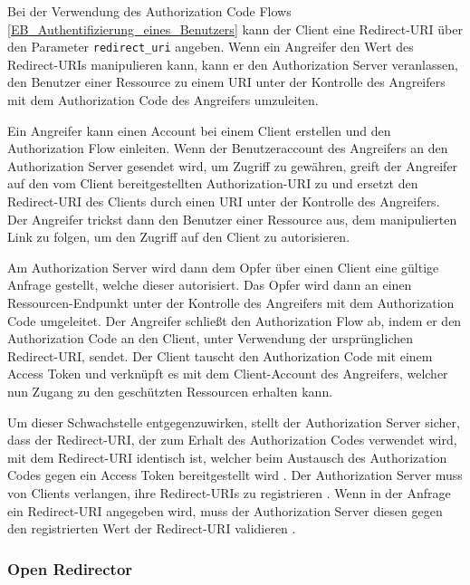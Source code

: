 Bei der Verwendung des Authorization Code Flows \ref{EB_Authentifizierung_eines_Benutzers} kann der Client eine Redirect-URI über den Parameter \texttt{redirect\_uri} angeben. Wenn ein Angreifer den Wert des Redirect-URIs manipulieren kann, kann er den Authorization Server veranlassen, den Benutzer einer Ressource zu einem URI unter der Kontrolle des Angreifers mit dem Authorization Code des Angreifers umzuleiten. \cite{SSEB_OAuthAuthorizationSecurityConsiderations}

Ein Angreifer kann einen Account bei einem Client erstellen und den Authorization Flow einleiten. Wenn der Benutzeraccount des Angreifers an den Authorization Server gesendet wird, um Zugriff zu gewähren, greift der Angreifer auf den vom Client bereitgestellten Authorization-URI zu und ersetzt den Redirect-URI des Clients durch einen URI unter der Kontrolle des Angreifers. Der Angreifer trickst dann den Benutzer einer Ressource aus, dem manipulierten Link zu folgen, um den Zugriff auf den Client zu autorisieren. \cite{SSEB_OAuthAuthorizationSecurityConsiderations}

Am Authorization Server wird dann dem Opfer über einen Client eine gültige Anfrage gestellt, welche dieser autorisiert. Das Opfer wird dann an einen Ressourcen-Endpunkt unter der Kontrolle des Angreifers mit dem Authorization Code umgeleitet. Der Angreifer schließt den Authorization Flow ab, indem er den Authorization Code an den Client, unter Verwendung der ursprünglichen Redirect-URI, sendet. Der Client tauscht den Authorization Code mit einem Access Token und verknüpft es mit dem Client-Account des Angreifers, welcher nun Zugang zu den geschützten Ressourcen erhalten kann. \cite{SSEB_OAuthAuthorizationSecurityConsiderations}

Um dieser Schwachstelle entgegenzuwirken, stellt der Authorization Server sicher, dass der Redirect-URI, der zum Erhalt des Authorization Codes verwendet wird, mit dem Redirect-URI identisch ist, welcher beim Austausch des Authorization Codes gegen ein Access Token bereitgestellt wird \cite{SSEB_OAuthAuthorizationSecurityConsiderations}\cite[Sec. 19]{SSEB_keycloakDocs}. Der Authorization Server muss von Clients verlangen, ihre Redirect-URIs zu registrieren \cite{SSEB_OAuthAuthorizationSecurityConsiderations}. Wenn in der Anfrage ein Redirect-URI angegeben wird, muss der Authorization Server diesen gegen den registrierten Wert der Redirect-URI validieren \cite[Sec. 19]{SSEB_keycloakDocs}.

\subsubsection{Open Redirector}

